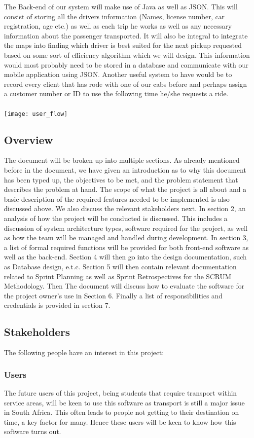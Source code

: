 \documentclass[a4paper,12pt]{article}
\begin{document}
The Back-end of our system will make use of Java as well as JSON. This will consist of storing all the drivers information (Names, license number, car registration, age etc.) as well as each trip he works as well as any necessary information about the passenger transported. It will also be integral to integrate the maps into finding which driver is best suited for the next pickup requested based on some sort of efficiency algorithm which we will design. This information would most probably need to be stored in a database and communicate with our mobile application using JSON. Another useful system to have would be to record every client that has rode with one of our cabs before and perhaps assign a customer number or ID to use the following time he/she requests a ride. \\\\
\texttt{[image: user\_flow]}
\pagebreak
\subsection{Overview}
The document will be broken up into multiple sections. As already mentioned before in the document, we have given an introduction as to why this document has been typed up, the objectives to be met, and the problem statement that describes the problem at hand. The scope of what the project is all about and a basic description of the required features needed to be implemented is also discussed above. We also discuss the relevant stakeholders next. In section 2, an analysis of how the project will be conducted is discussed. This includes a discussion of system architecture types, software required for the project, as well as how the team will be managed and handled during development. In section 3, a list of formal required functions will be provided for both front-end software as well as the back-end. Section 4 will then go into the design documentation, such as Database design, e.t.c. Section 5 will then contain relevant documentation related to Sprint Planning as well as Sprint Retrospectives for the SCRUM Methodology. Then The document will discuss how to evaluate the software for the project owner's use in Section 6. Finally a list of responsibilities and credentials is provided in section 7.
\subsection{Stakeholders}
The following people have an interest in this project:
\subsubsection{Users}
The future users of this project, being students that require transport within service areas, will be keen to use this software as transport is still a major issue in South Africa. This often leads to people not getting to their destination on time, a key factor for many. Hence these users will be keen to know how this software turns out.
\end{document}
